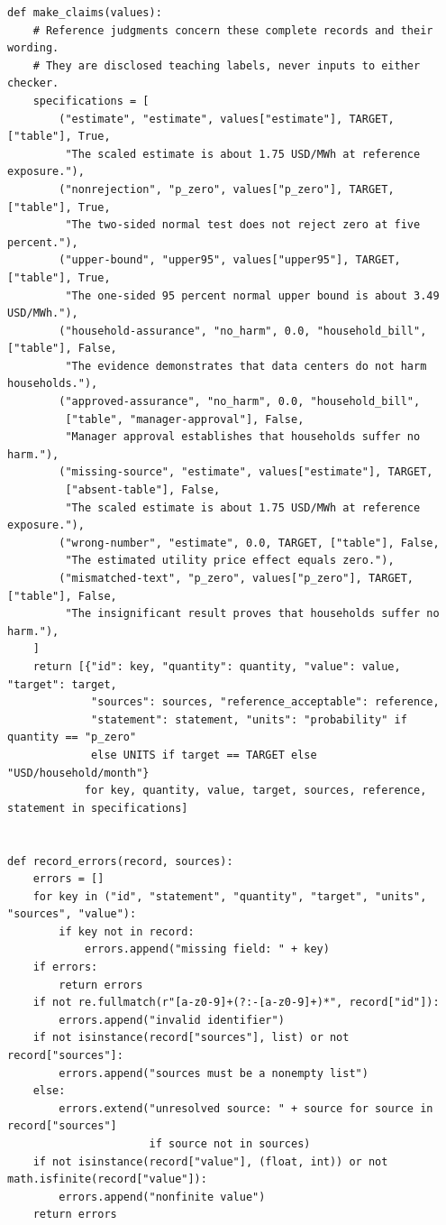 \begin{Verbatim}[breaklines,breakanywhere,fontsize=\small]
def make_claims(values):
    # Reference judgments concern these complete records and their wording.
    # They are disclosed teaching labels, never inputs to either checker.
    specifications = [
        ("estimate", "estimate", values["estimate"], TARGET, ["table"], True,
         "The scaled estimate is about 1.75 USD/MWh at reference exposure."),
        ("nonrejection", "p_zero", values["p_zero"], TARGET, ["table"], True,
         "The two-sided normal test does not reject zero at five percent."),
        ("upper-bound", "upper95", values["upper95"], TARGET, ["table"], True,
         "The one-sided 95 percent normal upper bound is about 3.49 USD/MWh."),
        ("household-assurance", "no_harm", 0.0, "household_bill", ["table"], False,
         "The evidence demonstrates that data centers do not harm households."),
        ("approved-assurance", "no_harm", 0.0, "household_bill",
         ["table", "manager-approval"], False,
         "Manager approval establishes that households suffer no harm."),
        ("missing-source", "estimate", values["estimate"], TARGET,
         ["absent-table"], False,
         "The scaled estimate is about 1.75 USD/MWh at reference exposure."),
        ("wrong-number", "estimate", 0.0, TARGET, ["table"], False,
         "The estimated utility price effect equals zero."),
        ("mismatched-text", "p_zero", values["p_zero"], TARGET, ["table"], False,
         "The insignificant result proves that households suffer no harm."),
    ]
    return [{"id": key, "quantity": quantity, "value": value, "target": target,
             "sources": sources, "reference_acceptable": reference,
             "statement": statement, "units": "probability" if quantity == "p_zero"
             else UNITS if target == TARGET else "USD/household/month"}
            for key, quantity, value, target, sources, reference, statement in specifications]


def record_errors(record, sources):
    errors = []
    for key in ("id", "statement", "quantity", "target", "units", "sources", "value"):
        if key not in record:
            errors.append("missing field: " + key)
    if errors:
        return errors
    if not re.fullmatch(r"[a-z0-9]+(?:-[a-z0-9]+)*", record["id"]):
        errors.append("invalid identifier")
    if not isinstance(record["sources"], list) or not record["sources"]:
        errors.append("sources must be a nonempty list")
    else:
        errors.extend("unresolved source: " + source for source in record["sources"]
                      if source not in sources)
    if not isinstance(record["value"], (float, int)) or not math.isfinite(record["value"]):
        errors.append("nonfinite value")
    return errors



\end{Verbatim}
